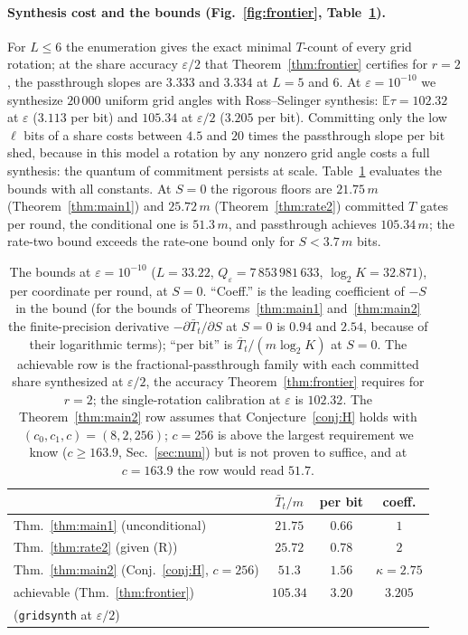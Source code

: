 \documentclass[aps,prx,twocolumn,superscriptaddress,nofootinbib,longbibliography]{revtex4-2}
\theoremstyle{plain}
\theoremstyle{definition}
\theoremstyle{remark}
\newcommand{\E}{\mathbb{E}}
\begin{document}
\paragraph{Synthesis cost and the bounds (Fig.~\ref{fig:frontier}, Table~\ref{tab:numbers}).} For $L\le6$ the enumeration gives the exact minimal $T$-count of every grid rotation; at the share accuracy $\varepsilon/2$ that Theorem~\ref{thm:frontier} certifies for $r=2$, the passthrough slopes are $3.333$ and $3.334$ at $L=5$ and $6$. At $\varepsilon=10^{-10}$ we synthesize $20\,000$ uniform grid angles with Ross--Selinger synthesis: $\E\tau=102.32$ at $\varepsilon$ ($3.113$ per bit) and $105.34$ at $\varepsilon/2$ ($3.205$ per bit). Committing only the low $\ell$ bits of a share costs between $4.5$ and $20$ times the passthrough slope per bit shed, because in this model a rotation by any nonzero grid angle costs a full synthesis: the quantum of commitment persists at scale. Table~\ref{tab:numbers} evaluates the bounds with all constants. At $S=0$ the rigorous floors are $21.75\,m$ (Theorem~\ref{thm:main1}) and $25.72\,m$ (Theorem~\ref{thm:rate2}) committed $T$ gates per round, the conditional one is $51.3\,m$, and passthrough achieves $105.34\,m$; the rate-two bound exceeds the rate-one bound only for $S<3.7\,m$ bits.


\begin{table}[t]
\centering\footnotesize
\caption{The bounds at $\varepsilon=10^{-10}$ ($L=33.22$, $Q_\varepsilon=7\,853\,981\,633$, $\log_2K=32.871$), per coordinate per round, at $S=0$. ``Coeff.'' is the leading coefficient of $-S$ in the bound (for the bounds of Theorems~\ref{thm:main1} and~\ref{thm:main2} the finite-precision derivative $-\partial\bar T_t/\partial S$ at $S=0$ is $0.94$ and $2.54$, because of their logarithmic terms); ``per bit'' is $\bar T_t/(m\log_2K)$ at $S=0$. The achievable row is the fractional-passthrough family with each committed share synthesized at $\varepsilon/2$, the accuracy Theorem~\ref{thm:frontier} requires for $r=2$; the single-rotation calibration at $\varepsilon$ is $102.32$. The Theorem~\ref{thm:main2} row assumes that Conjecture~\ref{conj:H} holds with $(c_0,c_1,c)=(8,2,256)$; $c=256$ is above the largest requirement we know ($c\ge163.9$, Sec.~\ref{sec:num}) but is not proven to suffice, and at $c=163.9$ the row would read $51.7$.}
\label{tab:numbers}
\setlength{\tabcolsep}{4pt}\begin{tabular}{@{}l ccc@{}}
\toprule
& $\bar T_t/m$ & per bit & coeff.\\
\midrule
Thm.~\ref{thm:main1} (unconditional) & $21.75$ & $0.66$ & $1$\\
Thm.~\ref{thm:rate2} (given (R)) & $25.72$ & $0.78$ & $2$\\
Thm.~\ref{thm:main2} (Conj.~\ref{conj:H}, $c=256$) & $51.3$ & $1.56$ & $\kappa=2.75$\\
achievable (Thm.~\ref{thm:frontier}) & $105.34$ & $3.20$ & $3.205$\\
\quad(\texttt{gridsynth} at $\varepsilon/2$) & & &\\
\bottomrule
\end{tabular}
\end{table}
\end{document}
